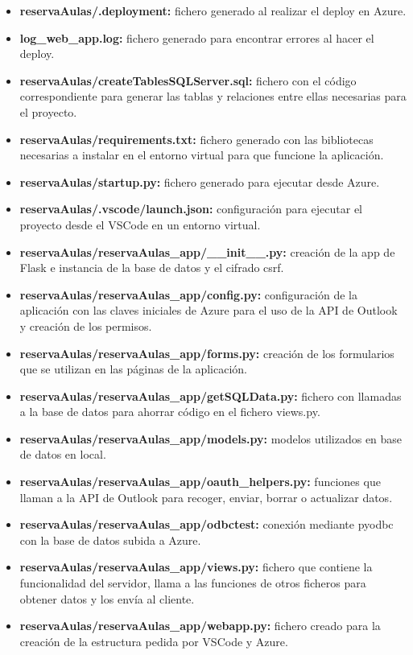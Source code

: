 \begin{itemize}
    \item \textbf{reservaAulas/.deployment:} fichero generado al realizar el deploy en Azure.
    \item \textbf{log\_web\_app.log:} fichero generado para encontrar errores al hacer el deploy.
    \item \textbf{reservaAulas/createTablesSQLServer.sql:} fichero con el código correspondiente para generar las tablas y relaciones entre ellas necesarias para el proyecto.
    \item \label{requirements} \textbf{reservaAulas/requirements.txt:} fichero generado con las bibliotecas necesarias a instalar en el entorno virtual para que funcione la aplicación.
    \item \textbf{reservaAulas/startup.py:} fichero generado para ejecutar desde Azure.
    \item \textbf{reservaAulas/.vscode/launch.json:} configuración para ejecutar el proyecto desde el VSCode en un entorno virtual.
    \item \textbf{reservaAulas/reservaAulas\_app/\_\_init\_\_.py:} creación de la app de Flask e instancia de la base de datos y el cifrado csrf.
    \item \textbf{reservaAulas/reservaAulas\_app/config.py:} configuración de la aplicación con las claves iniciales de Azure para el uso de la API de Outlook y creación de los permisos.
    \item \textbf{reservaAulas/reservaAulas\_app/forms.py:} creación de los formularios que se utilizan en las páginas de la aplicación.
    \item \textbf{reservaAulas/reservaAulas\_app/getSQLData.py:} fichero con llamadas a la base de datos para ahorrar código en el fichero views.py.
    \item \textbf{reservaAulas/reservaAulas\_app/models.py:} modelos utilizados en base de datos en local.
    \item \textbf{reservaAulas/reservaAulas\_app/oauth\_helpers.py:} funciones que llaman a la API de Outlook para recoger, enviar, borrar o actualizar datos.
    \item \textbf{reservaAulas/reservaAulas\_app/odbctest:} conexión mediante pyodbc con la base de datos subida a Azure.
    \item \textbf{reservaAulas/reservaAulas\_app/views.py:} fichero que contiene la funcionalidad del servidor, llama a las funciones de otros ficheros para obtener datos y los envía al cliente.
    \item \textbf{reservaAulas/reservaAulas\_app/webapp.py:} fichero creado para la creación de la estructura pedida por VSCode y Azure.

\end{itemize}
